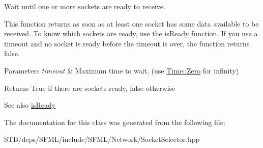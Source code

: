 Wait until one or more sockets are ready to receive. 

This function returns as soon as at least one socket has some data available to be received. To know which sockets are ready, use the is\+Ready function. If you use a timeout and no socket is ready before the timeout is over, the function returns false.


\begin{DoxyParams}{Parameters}
{\em timeout} & Maximum time to wait, (use \hyperlink{classsf_1_1_time_a8db127b632fa8da21550e7282af11fa0}{Time\+::\+Zero} for infinity)\\
\hline
\end{DoxyParams}
\begin{DoxyReturn}{Returns}
True if there are sockets ready, false otherwise
\end{DoxyReturn}
\begin{DoxySeeAlso}{See also}
\hyperlink{classsf_1_1_socket_selector_a8e67b463db05eadb4d356992c896833c}{is\+Ready} 
\end{DoxySeeAlso}


The documentation for this class was generated from the following file\+:\begin{DoxyCompactItemize}
\item 
S\+T\+B/deps/\+S\+F\+M\+L/include/\+S\+F\+M\+L/\+Network/Socket\+Selector.\+hpp\end{DoxyCompactItemize}
